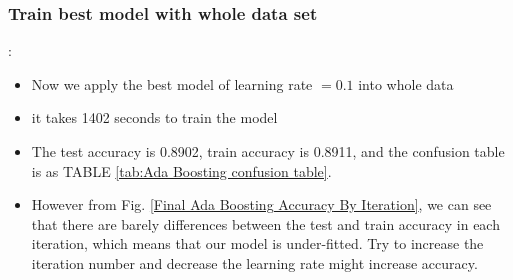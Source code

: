 \documentclass[8pt]{beamer}
\begin{document}
\subsubsection{Train best model with whole data set}
\begin{frame}[allowframebreaks]{\secname : \subsecname}{\subsubsecname}
\begin{itemize}
  \item Now we apply the best model of learning rate $=0.1$ into whole data
  \item it takes 1402 seconds to  train the model
  \item The test accuracy is 0.8902, train accuracy is 0.8911, and the confusion table is as TABLE \ref{tab:Ada Boosting confusion table}. 
  \item However from Fig. \ref{Final Ada Boosting Accuracy By Iteration}, we can see that there are barely differences between the test and train accuracy in each iteration, which means that our model is under-fitted. Try to increase the iteration number and decrease the learning rate might increase accuracy.
\end{itemize}



\end{frame}
\end{document}
